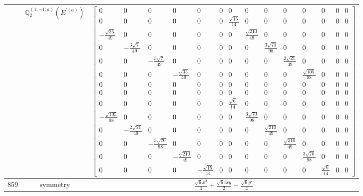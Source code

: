 \documentclass[fleqn,8pt,landscape]{jsarticle}
\begin{document}
\begin{longtable}{ccc}
$  $ & $ \mathbb{Q}_{2}^{(1,-1;a)}(E^{\prime(a)}) $ & $ \begin{bmatrix} 0 & 0 & 0 & 0 & 0 & 0 & 0 & 0 & 0 & 0 & 0 & 0 & 0 & 0 \\ 0 & 0 & 0 & 0 & 0 & 0 & \frac{\sqrt{15}}{14} & 0 & 0 & 0 & 0 & 0 & 0 & 0 \\ - \frac{\sqrt{35}}{49} & 0 & 0 & 0 & 0 & 0 & 0 & \frac{\sqrt{210}}{49} & 0 & 0 & 0 & 0 & 0 & 0 \\ 0 & - \frac{3 \sqrt{7}}{49} & 0 & 0 & 0 & 0 & 0 & 0 & \frac{3 \sqrt{70}}{98} & 0 & 0 & 0 & 0 & 0 \\ 0 & 0 & - \frac{3 \sqrt{7}}{49} & 0 & 0 & 0 & 0 & 0 & 0 & \frac{2 \sqrt{21}}{49} & 0 & 0 & 0 & 0 \\ 0 & 0 & 0 & - \frac{\sqrt{35}}{49} & 0 & 0 & 0 & 0 & 0 & 0 & \frac{\sqrt{105}}{98} & 0 & 0 & 0 \\ 0 & 0 & 0 & 0 & 0 & 0 & 0 & 0 & 0 & 0 & 0 & 0 & 0 & 0 \\ 0 & 0 & 0 & 0 & 0 & 0 & 0 & 0 & 0 & 0 & 0 & 0 & 0 & 0 \\ 0 & 0 & 0 & 0 & 0 & 0 & \frac{\sqrt{6}}{14} & 0 & 0 & 0 & 0 & 0 & 0 & 0 \\ - \frac{\sqrt{105}}{98} & 0 & 0 & 0 & 0 & 0 & 0 & \frac{3 \sqrt{70}}{98} & 0 & 0 & 0 & 0 & 0 & 0 \\ 0 & - \frac{2 \sqrt{21}}{49} & 0 & 0 & 0 & 0 & 0 & 0 & \frac{\sqrt{210}}{49} & 0 & 0 & 0 & 0 & 0 \\ 0 & 0 & - \frac{3 \sqrt{70}}{98} & 0 & 0 & 0 & 0 & 0 & 0 & \frac{\sqrt{210}}{49} & 0 & 0 & 0 & 0 \\ 0 & 0 & 0 & - \frac{\sqrt{210}}{49} & 0 & 0 & 0 & 0 & 0 & 0 & \frac{3 \sqrt{70}}{98} & 0 & 0 & 0 \\ 0 & 0 & 0 & 0 & - \frac{\sqrt{15}}{14} & 0 & 0 & 0 & 0 & 0 & 0 & \frac{\sqrt{6}}{14} & 0 & 0 \end{bmatrix} $ \\ \hline
$ 859 $ & $ \text{symmetry} $ & $ \frac{\sqrt{6} x^{2}}{4} + \frac{\sqrt{6} i x y}{2} - \frac{\sqrt{6} y^{2}}{4} $ \\

\end{longtable}
\end{document}
